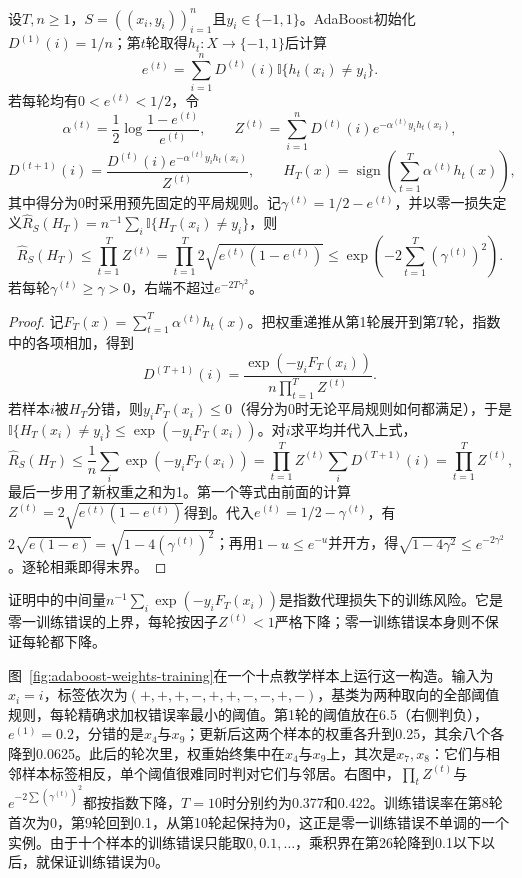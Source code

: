 \begin{theorem}[AdaBoost经验风险界]
\label{thm:adaboost-training}
\label{thm:adaboost-training-error}
设$T,n\geq1$，$S=((x_i,y_i))_{i=1}^n$且$y_i\in\{-1,1\}$。AdaBoost初始化$D^{(1)}(i)=1/n$；第$t$轮取得$h_t:X\to\{-1,1\}$后计算
\[
 e^{(t)}=\sum_{i=1}^nD^{(t)}(i)\mathbb I\{h_t(x_i)\neq y_i\}.
\]
若每轮均有$0<e^{(t)}<1/2$，令
\[
 \alpha^{(t)}=\frac12\log\frac{1-e^{(t)}}{e^{(t)}},\qquad
 Z^{(t)}=\sum_{i=1}^nD^{(t)}(i)e^{-\alpha^{(t)}y_i h_t(x_i)},
\]
\[
 D^{(t+1)}(i)
 =\frac{D^{(t)}(i)e^{-\alpha^{(t)}y_i h_t(x_i)}}{Z^{(t)}},
 \qquad
 H_T(x)=\operatorname{sign}\!\left(\sum_{t=1}^T\alpha^{(t)}h_t(x)\right),
\]
其中得分为0时采用预先固定的平局规则。记$\gamma^{(t)}=1/2-e^{(t)}$，并以零一损失定义$\hat R_S(H_T)=n^{-1}\sum_i\mathbb I\{H_T(x_i)\neq y_i\}$，则
\begin{equation}
 \hat R_S(H_T)\leq\prod_{t=1}^T Z^{(t)}
 =\prod_{t=1}^T2\sqrt{e^{(t)}(1-e^{(t)})}
 \leq\exp\left(-2\sum_{t=1}^T(\gamma^{(t)})^2\right).
 \label{eq:adaboost-training-bound}
\end{equation}
若每轮$\gamma^{(t)}\geq\gamma>0$，右端不超过$e^{-2T\gamma^2}$。
\end{theorem}

\begin{proof}
记$F_T(x)=\sum_{t=1}^T\alpha^{(t)}h_t(x)$。把权重递推从第1轮展开到第$T$轮，指数中的各项相加，得到
\[
 D^{(T+1)}(i)=\frac{\exp(-y_iF_T(x_i))}{n\prod_{t=1}^TZ^{(t)}}.
\]
若样本$i$被$H_T$分错，则$y_iF_T(x_i)\leq0$（得分为0时无论平局规则如何都满足），于是$\mathbb I\{H_T(x_i)\neq y_i\}\leq\exp(-y_iF_T(x_i))$。对$i$求平均并代入上式，
\[
 \hat R_S(H_T)\leq\frac1n\sum_i\exp(-y_iF_T(x_i))
 =\prod_{t=1}^TZ^{(t)}\sum_iD^{(T+1)}(i)=\prod_{t=1}^TZ^{(t)},
\]
最后一步用了新权重之和为1。第一个等式由前面的计算$Z^{(t)}=2\sqrt{e^{(t)}(1-e^{(t)})}$得到。代入$e^{(t)}=1/2-\gamma^{(t)}$，有$2\sqrt{e(1-e)}=\sqrt{1-4(\gamma^{(t)})^2}$；再用$1-u\leq e^{-u}$并开方，得$\sqrt{1-4\gamma^2}\leq e^{-2\gamma^2}$。逐轮相乘即得末界。
\end{proof}

证明中的中间量$n^{-1}\sum_i\exp(-y_iF_T(x_i))$是指数代理损失下的训练风险。它是零一训练错误的上界，每轮按因子$Z^{(t)}<1$严格下降；零一训练错误本身则不保证每轮都下降。

图~\ref{fig:adaboost-weights-training}在一个十点教学样本上运行这一构造。输入为$x_i=i$，标签依次为$(+,+,+,-,+,+,-,-,+,-)$，基类为两种取向的全部阈值规则，每轮精确求加权错误率最小的阈值。第1轮的阈值放在6.5（右侧判负），$e^{(1)}=0.2$，分错的是$x_4$与$x_9$；更新后这两个样本的权重各升到0.25，其余八个各降到0.0625。此后的轮次里，权重始终集中在$x_4$与$x_9$上，其次是$x_7,x_8$：它们与相邻样本标签相反，单个阈值很难同时判对它们与邻居。右图中，$\prod_tZ^{(t)}$与$e^{-2\sum(\gamma^{(t)})^2}$都按指数下降，$T=10$时分别约为0.377和0.422。训练错误率在第8轮首次为0，第9轮回到0.1，从第10轮起保持为0，这正是零一训练错误不单调的一个实例。由于十个样本的训练错误只能取$0,0.1,\ldots$，乘积界在第26轮降到0.1以下以后，就保证训练错误为0。

